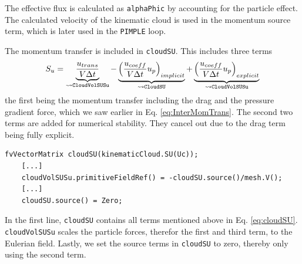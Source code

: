 
The effective flux is calculated as \lstinline|alphaPhic| by accounting for the particle effect.
The calculated velocity of the kinematic cloud is used in the momentum source term, which is later used in the \lstinline|PIMPLE| loop.


The momentum transfer is included in \lstinline|cloudSU|. This includes three terms
\begin{equation}
    \label{eq:cloudSU}
    S_u = \underbrace{\dfrac{u_{trans}}{V \Delta t}}_{\leadsto \texttt{CloudVolSUSu}} - \underbrace{\left(\dfrac{u_{coeff}}{V \Delta t} u_p \right)_{implicit}}_{\leadsto \texttt{CloudSU}} + \underbrace{\left(\dfrac{u_{coeff}}{V \Delta t} u_p \right)_{explicit}}_{\leadsto \texttt{CloudVolSUSu}}
\end{equation}
the first being the momentum transfer including the drag and the pressure gradient force, which we saw earlier in Eq. \eqref{eq:InterMomTrans}.
The second two terms are added for numerical stability. They cancel out due to the drag term being fully explicit.
\begin{lstlisting}[caption = MPPICFoam.C]
    fvVectorMatrix cloudSU(kinematicCloud.SU(Uc));
    [...]
    cloudVolSUSu.primitiveFieldRef() = -cloudSU.source()/mesh.V();
    [...]
    cloudSU.source() = Zero;
\end{lstlisting}
In the first line, \lstinline|cloudSU| contains all terms mentioned above in Eq. \eqref{eq:cloudSU}.
\lstinline|cloudVolSUSu| scales the particle forces, therefor the first and third term, to the Eulerian field.
Lastly, we set the source terms in \lstinline|cloudSU| to zero, thereby only using the second term.






